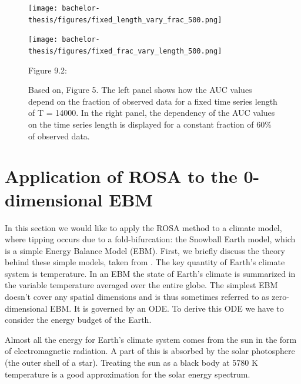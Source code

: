 \documentclass[%
thesis=student,%
coverpage=false,%
titlepage=false,%
headmarks=true, %
english,%
font=libertine, %
math=newpxtx, %
BCOR=5mm,%
coverBCOR=11mm%
]{tumbook}
\begin{document}
\begin{figure}[h!]
    \centering
    \begin{minipage}[t]{0.45\textwidth}
        \centering
        \texttt{[image: bachelor-thesis/figures/fixed\_length\_vary\_frac\_500.png]}
    \end{minipage}
    \hfill
    \begin{minipage}[t]{0.45\textwidth}
        \centering
        \texttt{[image: bachelor-thesis/figures/fixed\_frac\_vary\_length\_500.png]}
    \end{minipage}
    \vspace{0.5cm}
    
    \centering
    \begin{minipage}[b]{0.9\textwidth}
        \centering     
        Figure 9.2: 
    \end{minipage}
    \caption{Based on\cite{Morr:2024}, Figure 5. The left panel shows how the AUC values depend on the fraction of observed data for a fixed time series length of T = 14000. In the right panel, the dependency of the AUC values on the time series length is displayed for a constant fraction of 60\% of observed data. }
    \label{fig:time_length_and_fraction_of_observed_data_dependence}
\end{figure}


\chapter{Application of ROSA to the 0-dimensional EBM}

In this section we would like to apply the ROSA method to a climate model, where tipping occurs due to a fold-bifurcation: the Snowball Earth model, which is a simple Energy Balance Model (EBM). First, we briefly discuss the theory behind these simple models, taken from \cite{Kaper:2013}. The key quantity of Earth's climate system is temperature. In an EBM the state of Earth's climate is summarized in the variable temperature averaged over the entire globe. The simplest EBM doesn't cover any spatial dimensions and is thus sometimes referred to as zero-dimensional EBM. It is governed by an ODE. To derive this ODE we have to consider the energy budget of the Earth.

Almost all the energy for Earth's climate system comes from the sun in the form of electromagnetic radiation. A part of this is absorbed by the solar photosphere (the outer shell of a star). Treating the sun as a black body at 5780 K temperature is a good approximation for the solar energy spectrum.
\end{document}
